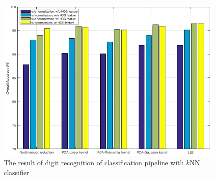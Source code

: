 \documentclass[12pt]{article}
\begin{document}
\begin{figure}[tbp]
	\centering
	\includegraphics[width =\textwidth]{knn}		
	\caption{The result of digit recognition of classification pipeline with $k$NN classifier}
	\label{fig:knn}
\end{figure}
\end{document}
